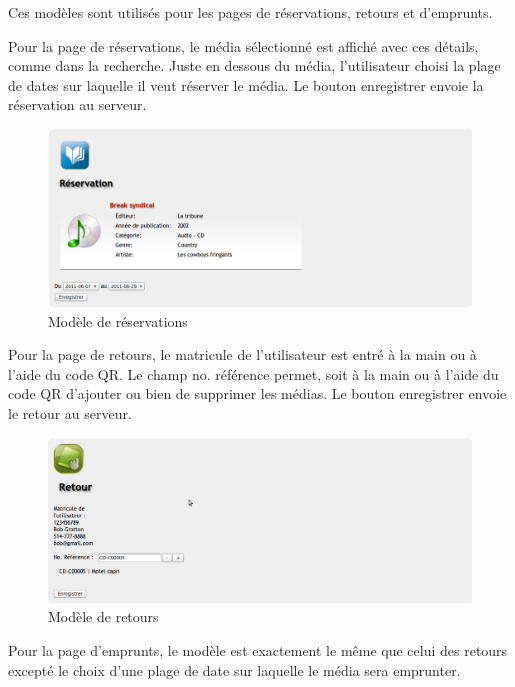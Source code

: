 \documentclass[letter, 11pt]{report}
\begin{document}
Ces modèles sont utilisés pour les pages de réservations, retours et d'emprunts. 

Pour la page de réservations, le média sélectionné est affiché avec ces détails, comme dans la recherche. Juste en dessous du média, l'utilisateur choisi la plage de dates sur laquelle il veut réserver le média. Le bouton enregistrer envoie la réservation au serveur.

\begin{figure}[htbp]
	\begin{center}
		\includegraphics[scale=0.25]{captures_ecran/reservation.png}
	\end{center}
	\caption{Modèle de réservations}
\end{figure}

Pour la page de retours, le matricule de l'utilisateur est entré à la main ou à l'aide du code QR. Le champ no. référence permet, soit à la main ou à l'aide du code QR d'ajouter ou bien de supprimer les médias. Le bouton enregistrer envoie le retour au serveur.

\begin{figure}[htbp]
	\begin{center}
		\includegraphics[scale=0.25]{captures_ecran/retour.png}
	\end{center}
	\caption{Modèle de retours}
\end{figure}

Pour la page d'emprunts, le modèle est exactement le même que celui des retours excepté le choix d'une plage de date sur laquelle le média sera emprunter.
\end{document}

